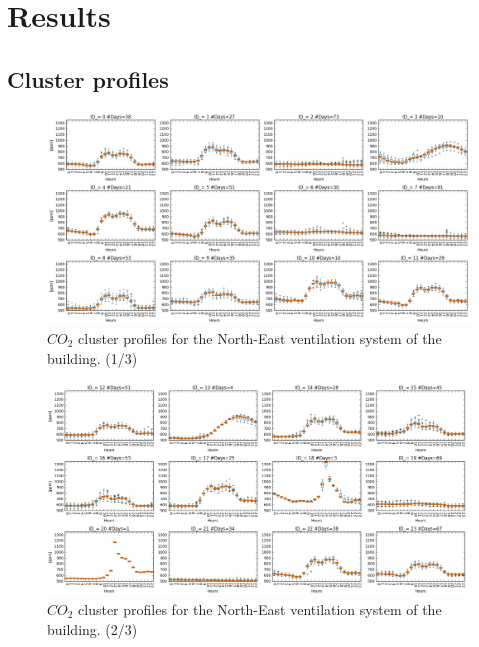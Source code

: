 
\chapter{Results} %

\label{AppendixB} %


\pagebreak


\begin{landscape}
\leavevmode
\section{Cluster profiles}
\label{cluster_profiles}
\begin{figure}[h!]
  \vspace{0.5em} %
  \includegraphics[scale=0.6]{Figures/candidates_CO2_NE_1.jpg}
  \caption{$CO_2$ cluster profiles for the North-East ventilation system of the building. (1/3) }
  \label{fig:candidates_profiles_NE}
\end{figure}

\begin{figure}[h!]
  \vspace{0.5em} %
  \includegraphics[scale=0.6]{Figures/candidates_CO2_NE_2.jpg}
  \caption{$CO_2$ cluster profiles for the North-East ventilation system of the building. (2/3) }
  \label{fig:candidates_profiles_NE}
\end{figure}


\end{landscape}
